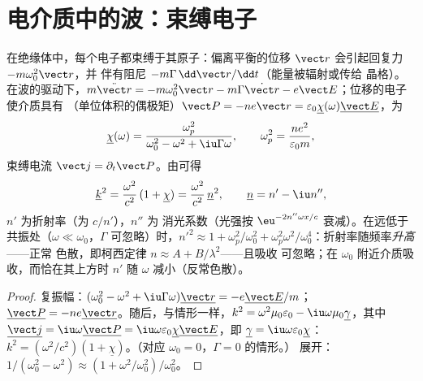 \section{电介质中的波：束缚电子}

\begin{proposition}\label{prop:b2:waves-in-media:lorentz}
在绝缘体中，每个电子都束缚于其原子：偏离平衡的位移
$\vect r$ 会引起回复力 $-m\omega_0^2\vect r$，并
伴有阻尼 $-m\Gamma\,\dd\vect r/\dd t$（能量被辐射或传给
晶格）。在波的驱动下，$m\ddot{\vect r} = -m\omega_0^2\vect r - m\Gamma\dot{\vect r}
- e\vect E$；位移的电子使介质具有\emph{}
（单位体积的偶极矩）$\vect P = -ne\vect r = \varepsilon_0\underline\chi(\omega)
\underline{\vect E}$，\emph{}为
\[
\underline\chi(\omega) = \frac{\omega_p^2}{\omega_0^2 - \omega^2 + \iu\Gamma\omega} ,
\qquad \omega_p^2 = \frac{ne^2}{\varepsilon_0m} ,
\]
束缚电流 $\vect j = \partial_t\vect P$。由可得
\[
\underline k^2 = \frac{\omega^2}{c^2}\,(1 + \underline\chi) = \frac{\omega^2}{c^2}\,\underline n^2 ,
\qquad \underline n = n' - \iu n'' ,
\]
$n'$ 为折射率（为 $c/n'$），$n''$ 为
消光系数（光强按 $\eu^{-2n''\omega x/c}$ 衰减）。在远低于
共振处（$\omega \ll \omega_0$，$\Gamma$ 可忽略）时，$n'^2 \approx 1 + \omega_p^2/\omega_0^2 +
\omega_p^2\omega^2/\omega_0^4$：折射率随频率\emph{升高}——正常
色散，即柯西定律 $n \approx A + B/\lambda^2$——且吸收
可忽略；在 $\omega_0$ 附近介质吸收，而恰在其上方时 $n'$
随 $\omega$ 减小（反常色散）。
\end{proposition}

\begin{proof}
复振幅：$(\omega_0^2 - \omega^2 + \iu\Gamma\omega)\underline{\vect r} = -e\underline{\vect E}
/m$；$\underline{\vect P} = -ne\underline{\vect r}$。随后，与情形一样，$k^2 = \omega^2\mu_0
\varepsilon_0 - \iu\omega\mu_0\underline\gamma$，其中 $\underline{\vect j} = \iu\omega\underline{\vect P} = \iu\omega\varepsilon_0
\underline\chi\underline{\vect E}$，即 $\underline\gamma = \iu\omega\varepsilon_0\underline\chi$：$k^2 = (\omega^2/c^2)
(1 + \underline\chi)$。（对应 $\omega_0 = 0$，$\Gamma = 0$ 的情形。）
展开：$1/(\omega_0^2 - \omega^2) \approx (1 + \omega^2/\omega_0^2)/\omega_0^2$。
\end{proof}

